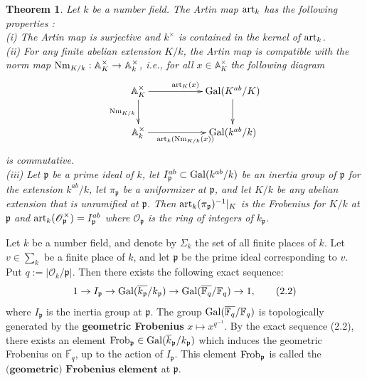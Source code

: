 \documentclass[reqno,a4paper,11pt]{amsart}
\newtheorem{thm}[dfn]{Theorem}
\theoremstyle{definition}
\theoremstyle{definition}
\begin{document}
    \begin{thm}\cite[Chapter II, Theorem 3.5]{silv}\label{class 2}
        Let $k$ be a number field. The Artin map ${\rm art}_{k}$ has the following properties :
        \\\indent (i) The Artin map is surjective and $k^{\times}$ is contained in the kernel of ${\rm art}_{k}$.
        \\\indent (ii) For any finite abelian extension $K/k$, the Artin map is compatible with the norm map ${\rm Nm}_{K/k} : \mathbb{A}^{\times}_{K}\to \mathbb{A}^{\times}_{k}$, i.e., for all $x\in \mathbb{A}^{\times}_{K}$ the following diagram
        \[\xymatrix{\mathbb{A}^{\times}_{K}
        \ar[rr]^{{\rm art}_{K}(x)}\ar[d]_{{\rm Nm}_{K/k}}&&{\rm Gal}(K^{ab}/K)\ar[d]\\
        \mathbb{A}^{\times}_{k} \ar[rr]_{{\rm art}_{k}({\rm Nm}_{K/k}(x))} && {\rm Gal}(k^{ab}/k)}
        \] is commutative.
        \\\indent (iii) Let $\mathfrak{p}$ be a prime ideal of $k$, let $I^{ab}_{\mathfrak{p}}\subset {\rm Gal}(k^{ab}/k)$ be an inertia group of $\mathfrak{p}$ for the extension $k^{ab}/k$, let $\pi_{\mathfrak{p}}$ be a uniformizer at $\mathfrak{p}$, and let $K/k$ be any abelian extension that is unramified at $\mathfrak{p}$. Then
            ${\rm art}_{k}(\pi_{\mathfrak{p}})^{-1}|_{K}$
        is the Frobenius for $K/k$ at $\mathfrak{p}$ and ${\rm art}_{k}(\mathscr{O}_{\mathfrak{p}}^{\times})=I^{ab}_{\mathfrak{p}}$ where $\mathscr{O}_{\mathfrak{p}}$ is the  ring of integers of $k_{\mathfrak{p}}$. 
    \end{thm}
Let $k$ be a number field, and  denote by  $\Sigma_{k}$ the set of all finite places of $k$. Let $v\in \sum_{k}$ be a finite place of $k$, and let $\mathfrak{p}$ be the prime ideal corresponding to $v$. Put $q :=|\mathscr{O}_{k}/\mathfrak{p}|$. Then there exists the following exact sequence:
\begin{align}
    1\to I_{\mathfrak{p}}\to {\rm Gal}(\overline{k_{\mathfrak{p}}}/k_{\mathfrak{p}})\to {\rm Gal}(\overline{\mathbb{F}_{q}}/\mathbb{F}_{q})\to 1,\tag{2.2}
\end{align}
where $I_{\mathfrak{p}}$ is the inertia group at $\mathfrak{p}$. The group ${\rm Gal}(\overline{\mathbb{F}_{q}}/\mathbb{F}_{q})$ is topologically generated by the \textbf{geometric Frobenius} $x\mapsto x^{q^{-1}}$. By the exact sequence (2.2), there exists an element ${\rm Frob}_{\mathfrak{p}}\in {\rm Gal}(\overline{k}_{\mathfrak{p}}/k_{\mathfrak{p}})$ which induces the geometric Frobenius on $\overline{\mathbb{F}_{q}}$, up to the action of $I_{\mathfrak{p}}$. This  element ${\rm Frob}_{\mathfrak{p}}$ is called the $\textbf{(geometric) Frobenius element}$ at $\mathfrak{p}$. 
\end{document}
